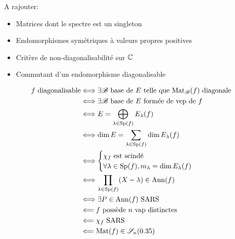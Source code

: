 A rajouter:
\begin{itemize}
    \item Matrices dont le spectre est un singleton
    \item Endomorphismes symétriques à valeurs propres positives
    \item Critère de non-diagonalisabilité sur $\mathbb{C}$
    \item Commutant d'un endomorphisme diagonalisable 
\end{itemize}

\newpage

\begin{figure*}
    \begin{Large}
    \begin{align*}
        f \text{ diagonalisable} &\Longleftrightarrow \exists \mathscr{B} \text{ base de } E \text{ telle que } \mathrm{Mat}_\mathscr{B}(f) \text{ diagonale} \\
        &\Longleftrightarrow \exists \mathscr{B} \text{ base de } E \text{ formée de vep de } f\\
        &\Longleftrightarrow E = \bigoplus_{\lambda \in \mathrm{Sp}(f)} E_\lambda(f) \\
        &\Longleftrightarrow \dim E = \sum_{\lambda \in \mathrm{Sp}(f)} \dim E_\lambda(f) \\
        &\Longleftrightarrow 
        \begin{cases}
        \chi_f \text{ est scindé} \\
        \forall \lambda \in \mathrm{Sp}(f), m_{\lambda} = \dim E_\lambda(f)
        \end{cases} \\
        &\Longleftrightarrow \prod_{\lambda \in \mathrm{Sp}(f)}(X-\lambda) \in \mathrm{Ann}(f)\\
        &\Longleftrightarrow \exists P \in \mathrm{Ann}(f) \text{ SARS} \\
        &\Longleftarrow f \text{ possède } n \text{ vap distinctes} \\
        &\Longleftarrow \chi_f \text{ SARS} \\
        &\Longleftarrow \mathrm{Mat}(f) \in \mathscr{S}_n(0.35)
    \end{align*}
    \end{Large}
\end{figure*}

\begin{figure*}[h!]
    
\end{figure*}